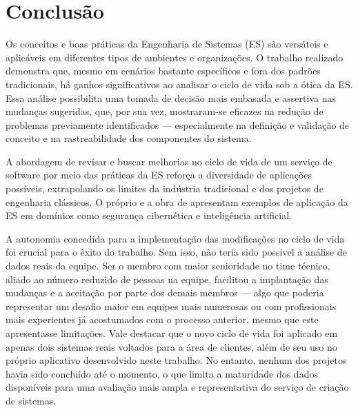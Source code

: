 
\chapter{Conclusão}\label{chap:conclusao}

Os conceitos e boas práticas da Engenharia de Sistemas (ES) são versáteis e aplicáveis em diferentes tipos de ambientes e organizações. O trabalho realizado demonstra que,
mesmo em cenários bastante específicos e fora dos padrões tradicionais, há ganhos significativos ao analisar o ciclo de vida sob a ótica da ES. Essa análise possibilita uma
tomada de decisão mais embasada e assertiva nas mudanças sugeridas, que, por sua vez, mostraram-se eficazes na redução de problemas previamente identificados — especialmente na
definição e validação de conceito e na rastreabilidade dos componentes do sistema.

A abordagem de revisar e buscar melhorias no ciclo de vida de um serviço de software por meio das práticas da ES reforça a diversidade de aplicações possíveis, extrapolando os
limites da indústria tradicional e dos projetos de engenharia clássicos. O próprio \cite{incoseHandbook} e a obra de \cite{kossiakoff2020systems} apresentam exemplos de aplicação
da ES em domínios como segurança cibernética e inteligência artificial.

A autonomia concedida para a implementação das modificações no ciclo de vida foi crucial para o êxito do trabalho. Sem isso, não teria sido possível a análise de dados reais da equipe.
Ser o membro com maior senioridade no time técnico, aliado ao número reduzido de pessoas na equipe, facilitou a implantação das mudanças e a aceitação por parte dos demais
membros — algo que poderia representar um desafio maior em equipes mais numerosas ou com profissionais mais experientes já acostumados com o processo anterior, mesmo que este
apresentasse limitações. Vale destacar que o novo ciclo de vida foi aplicado em apenas dois sistemas reais voltados para a área de clientes, além de seu uso no próprio aplicativo
desenvolvido neste trabalho. No entanto, nenhum dos projetos havia sido concluído até o momento, o que limita a maturidade dos dados disponíveis para uma avaliação mais ampla e
representativa do serviço de criação de sistemas.

